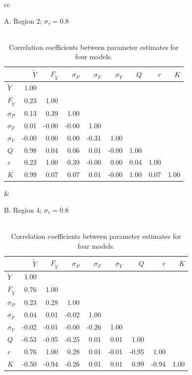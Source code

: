 \documentclass[12pt,letterpaper]{article}
\newcommand\MSY{\widetilde{Y}}
\newcommand\Fmsy{F_{\MSY}}
\begin{document}
\begin{table}
\caption{Correlation coefficients between parameter estimates for four
models.
\label{tab:correl}}
   \begin{tabular}[h]{cc}

      \begin{minipage}[t]{0.5\textwidth}
         \scriptsize

\begin{center}
{\Large A. Region 2; $\sigma_r = 0.8$}\\
~\\
\begin{tabular}{|lrrrrrrrr|}
\hline
&$\MSY$&$\Fmsy$&$\sigma_P$&$\sigma_F$&$\sigma_Y$&$Q$&$r$&$K$\\
\hline
$\MSY$&1.00&&&&&&&\\
$\Fmsy$&0.23&1.00&&&&&&\\
$\sigma_P$&0.13&0.39&1.00&&&&&\\
$\sigma_F$&0.01&-0.00&-0.00&1.00&&&&\\
$\sigma_Y$&-0.00&0.00&0.00&-0.31&1.00&&&\\
$Q$&0.98&0.04&0.06&0.01&-0.00&1.00&&\\
$r$&0.23&1.00&0.39&-0.00&0.00&0.04&1.00&\\
$K$&0.99&0.07&0.07&0.01&-0.00&1.00&0.07&1.00\\
\hline
\end{tabular}
\end{center}

      \end{minipage} &
      \begin{minipage}[t]{0.5\textwidth}
         \scriptsize

\begin{center}
{\Large B. Region 4; $\sigma_r = 0.8$}\\
~\\
\begin{tabular}{|lrrrrrrrr|}
\hline
&$\MSY$&$\Fmsy$&$\sigma_P$&$\sigma_F$&$\sigma_Y$&$Q$&$r$&$K$\\
\hline
$\MSY$&1.00&&&&&&&\\
$\Fmsy$&0.76&1.00&&&&&&\\
$\sigma_P$&0.23&0.28&1.00&&&&&\\
$\sigma_F$&0.04&0.01&-0.02&1.00&&&&\\
$\sigma_Y$&-0.02&-0.01&-0.00&-0.26&1.00&&&\\
$Q$&-0.53&-0.95&-0.25&0.01&0.01&1.00&&\\
$r$&0.76&1.00&0.28&0.01&-0.01&-0.95&1.00&\\
$K$&-0.50&-0.94&-0.26&0.01&0.01&0.99&-0.94&1.00\\
\hline
\end{tabular}
\end{center}


\end{minipage}
\end{tabular}
\end{table}
\end{document}
